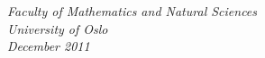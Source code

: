 \documentclass[a4paper]{article}
\begin{document}
\begin{center}
  \vspace{3mm}
  \textsl{Faculty of Mathematics and Natural Sciences} \\
  \textsl{University of Oslo} \\
  \vspace{2mm}
  \large
  \textsl{December 2011} \\
  \normalsize
\end{center}
\end{document}
